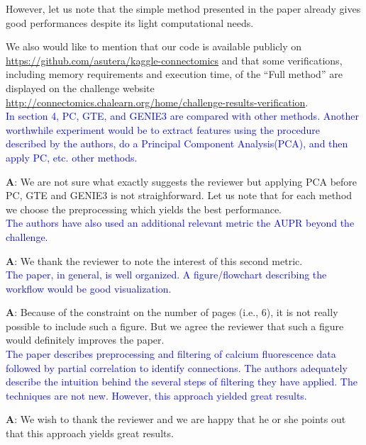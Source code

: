 \documentclass[wcp]{jmlr}
\begin{document}
However, let us note that the simple method presented in the paper already gives good performances despite its light computational needs.

We also would like to mention that our code is available publicly on \url{https://github.com/asutera/kaggle-connectomics} and that some verifications, including memory requirements and execution time, of the ``Full method'' are displayed on the challenge website \url{http://connectomics.chalearn.org/home/challenge-results-verification}.\\

\noindent
\textcolor{blue}{In section 4, PC, GTE, and GENIE3 are compared with other methods. Another worthwhile experiment would be to extract features using the procedure described by the authors, do a Principal Component Analysis(PCA), and then apply PC, etc. other methods.}

\textbf{A}: We are not sure what exactly suggests the reviewer but applying PCA before PC, GTE and GENIE3 is not straighforward. Let us note that for each method we choose the preprocessing which yields the best performance.\\

\noindent
\textcolor{blue}{The authors have also used an additional relevant metric the AUPR beyond the challenge.}

\textbf{A}: We thank the reviewer to note the interest of this second metric.\\

\noindent
\textcolor{blue}{The paper, in general, is well organized. A figure/flowchart describing the workflow would be good visualization.}

\textbf{A}: Because of the constraint on the number of pages (i.e., $6$), it is not really possible to include such a figure. But we agree the reviewer that such a figure would definitely improves the paper.\\


\noindent
\textcolor{blue}{The paper describes preprocessing and filtering of calcium fluorescence data followed by partial correlation to identify connections.  The authors adequately describe the intuition behind the several steps of filtering they have applied.  The techniques are not new. However, this approach yielded great results.}

\textbf{A}: We wish to thank the reviewer and we are happy that he or she points out that this approach yields great results.\\
\end{document}
